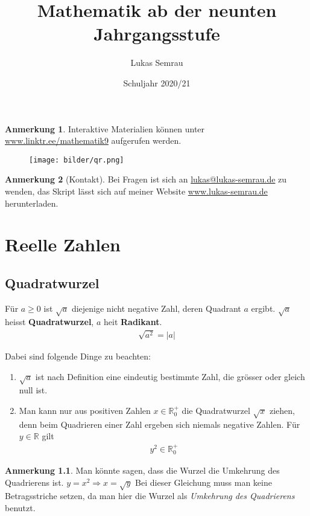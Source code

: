 \documentclass{report}
\newcommand{\Ra}{\Rightarrow}
\newcommand{\R}{\mathbb{R}}
\theoremstyle{definition}
\theoremstyle{definition}
\theoremstyle{an}
\newtheorem{anm}{Anmerkung}[section]
\theoremstyle{lem}
\theoremstyle{def}
\theoremstyle{def}
\begin{document}
	\title{Mathematik ab der neunten Jahrgangsstufe}
	\author{Lukas Semrau}
	\date{Schuljahr 2020/21}
	
	\tableofcontents
	\listoffigures \bigskip
	\begin{anm}
		Interaktive Materialien können unter \url{www.linktr.ee/mathematik9} aufgerufen werden.
		\begin{figure}[h]
			\centering\texttt{[image: bilder/qr.png]}
		\end{figure}
	\end{anm}

	
	\begin{anm}[Kontakt]
		Bei Fragen ist sich an \url{lukas@lukas-semrau.de} zu wenden, das Skript lässt sich auf meiner Website \url{www.lukas-semrau.de} herunterladen.
	\end{anm}
	
	\pagebreak
	\chapter{Reelle Zahlen}
 	\section{Quadratwurzel}
	\begin{defi}[Quadratwurzel]
		Für $a \geq 0$ ist $\sqrt{a}$ diejenige nicht negative Zahl, deren Quadrant $a$ ergibt. $\sqrt{a}$ heisst \textbf{Quadratwurzel}, $a$ heit \textbf{Radikant}.
		\begin{align}
			\sqrt{a^2}=\left| a \right|
		\end{align}
	\end{defi}
	
	Dabei sind folgende Dinge zu beachten:
	\begin{enumerate}
		\item $\sqrt{a}$ ist nach Definition eine eindeutig bestimmte Zahl, die grösser oder gleich null ist. \reversemarginpar {}
		\item Man kann nur aus positiven Zahlen $x\in \R^+_0$ die Quadratwurzel $\sqrt{x}$ ziehen, denn beim Quadrieren einer Zahl ergeben sich niemals negative Zahlen. Für $y\in \R$ gilt
		\begin{align}
			y^2\in \R^+_0
		\end{align}
	\end{enumerate}
	\begin{anm}
		Man könnte sagen, dass die Wurzel die Umkehrung des Quadrierens ist. \quad $y=x^2 \Ra x=\sqrt{y}$ \quad Bei dieser Gleichung muss man keine Betragsstriche setzen, da man hier die Wurzel als \textit{Umkehrung des Quadrierens} benutzt.  
	\end{anm}
\end{document}
